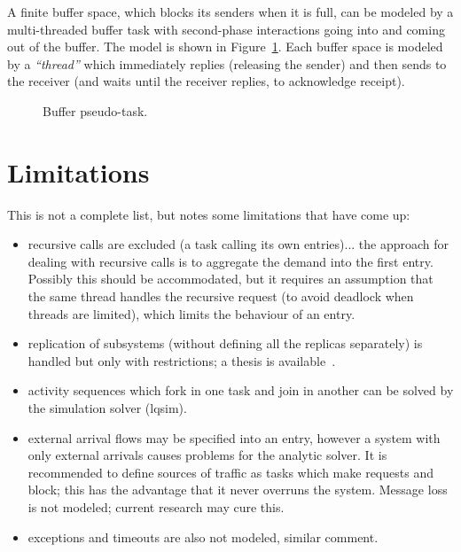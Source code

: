 \documentclass[11pt]{article}
\begin{document}
A finite buffer space, which blocks its senders when it is full, can
be modeled by a multi-threaded buffer task with second-phase
interactions going into and coming out of the buffer.  The model is
shown in Figure~\ref{fig:finite-buffers}.  Each buffer space is
modeled by a \emph{``thread''} which immediately replies (releasing the sender)
and then sends to the receiver (and waits until the receiver replies,
to acknowledge receipt).

\begin{figure}[htbp]
  \centering
  \caption{Buffer pseudo-task.} 
  \label{fig:finite-buffers}
\end{figure}


\section{Limitations}
\label{sec:limitations}

This is not a complete list, but notes some limitations that have come
up:

\begin{itemize}
\item recursive calls are excluded (a task calling its own
  entries)... the approach for dealing with recursive calls is to
  aggregate the demand into the first entry. Possibly this should be
  accommodated, but it requires an assumption that the same thread
  handles the recursive request (to avoid deadlock when threads are
  limited), which limits the behaviour of an entry.
\item replication of subsystems (without defining all the replicas
  separately) is handled but only with restrictions; a thesis is
  available~\cite{THESIS:pan-96}.
\item activity sequences which fork in one task and join in another can be solved by the simulation
  solver (lqsim).
\item external arrival flows may be specified into an entry, however a
  system with only external arrivals causes problems for the analytic
  solver. It is recommended to define sources of traffic as tasks
  which make requests and block; this has the advantage that it never
  overruns the system. Message loss is not modeled; current research
  may cure this.
\item exceptions and timeouts are also not modeled, similar comment.
\end{itemize}
\end{document}
